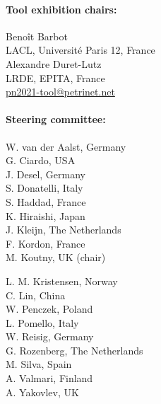 \documentclass[10pt,a4paper]{article}
\newcommand{\styleUniv}[1]{\textcolor{black!75}{#1}}
\begin{document}
\begin{multicols}{2}
\vspace*{-0.5em}
\paragraph*{Tool exhibition chairs:}\mbox{}

\noindent Benoît Barbot \\
\indent \styleUniv{LACL, Université Paris 12, France} \\
\noindent Alexandre Duret-Lutz \\
\indent \styleUniv{LRDE, EPITA, France} \\
\href{mailto:pn2021-tool@petrinet.net}{pn2021-tool@petrinet.net}

\mbox{}

\columnbreak

\paragraph*{Steering committee:}\mbox{}

\vspace*{-1em}
\setlength{\columnsep}{0.2cm}
\begin{multicols}{2}
\noindent W. van der Aalst, Germany\\
G. Ciardo, USA\\
J. Desel, Germany\\
S. Donatelli, Italy\\
S. Haddad, France\\
K. Hiraishi, Japan\\
J. Kleijn, The Netherlands\\
F. Kordon, France\\
M. Koutny, UK (chair)\\

\columnbreak

\noindent L. M. Kristensen, Norway\\
C. Lin, China\\
W. Penczek, Poland\\
L. Pomello, Italy\\
W. Reisig, Germany\\
G. Rozenberg, The Netherlands\\
M. Silva, Spain\\
A. Valmari, Finland\\
A. Yakovlev, UK\\
\end{multicols}


\end{multicols}
\end{document}

